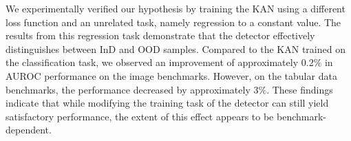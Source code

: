 We experimentally verified our hypothesis by training the KAN using a different loss function and an unrelated task, namely regression to a constant value. 
The results from this regression task demonstrate that the detector effectively distinguishes between InD and OOD samples. 
Compared to the KAN trained on the classification task, we observed an improvement of approximately $0.2\%$ in AUROC performance on the image benchmarks. 
However, on the tabular data benchmarks, the performance decreased by approximately $3\%$.
These findings indicate that while modifying the training task of the detector can still yield satisfactory performance, the extent of this effect appears to be benchmark-dependent.
